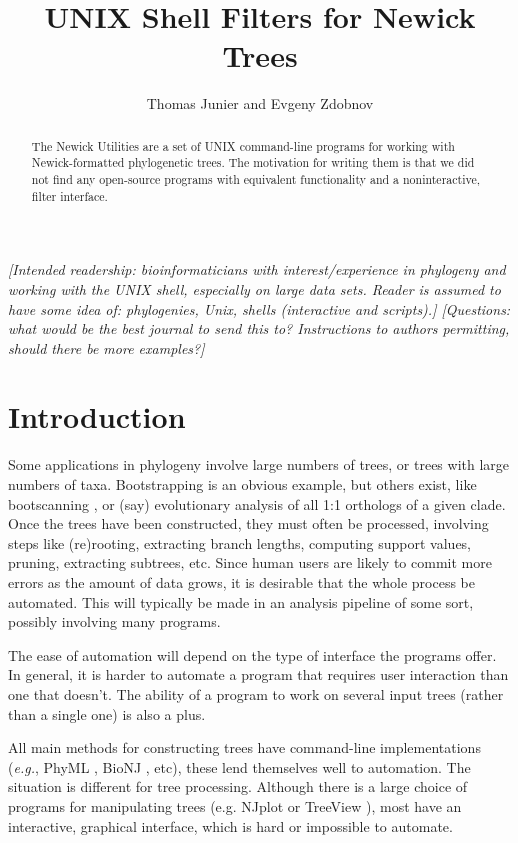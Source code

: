 \documentclass[a4paper,11pt]{article}
\title{UNIX Shell Filters for Newick Trees}
\author{Thomas Junier and Evgeny Zdobnov}
\begin{document}
\maketitle

\begin{abstract}
The Newick Utilities are a set of UNIX command-line programs for working with
Newick-formatted phylogenetic trees. The motivation for writing them is that we did not find any open-source programs with equivalent functionality and a noninteractive, filter interface.
\end{abstract}

\textit{\noindent{} [Intended readership: bioinformaticians with interest/experience in phylogeny and working with the UNIX shell, especially on large data sets. Reader is assumed to have some idea of: phylogenies, Unix, shells (interactive and scripts).]
[Questions: what would be the best journal to send this to? Instructions to authors permitting, should there be more examples?]}
 
\section*{Introduction}

Some applications in phylogeny involve large numbers of trees, or trees with large numbers of taxa. Bootstrapping is an obvious example, but others exist, like bootscanning \cite{Salminen1995}, or (say) evolutionary analysis of all 1:1 orthologs of a given clade. Once the trees have been constructed, they must often be processed, involving steps like (re)rooting, extracting branch lengths, computing support values, pruning, extracting subtrees, etc. Since human users are likely to commit more errors as the amount of  data grows, it is desirable that the whole process  be automated. This will typically be made in an analysis pipeline of some sort, possibly involving many programs.

The ease of automation will depend on the type of interface the programs offer. In general, it is harder to automate a program that requires user interaction than one that doesn't. The ability of a program to work on several input trees (rather than a single one) is also a plus.

All main methods for constructing trees have command-line implementations (\textit{e.g.}, PhyML \cite{Guindon2003}, BioNJ \cite{Gascuel1997}, etc), these lend themselves well to automation. 
The situation is different for tree processing. Although there is a large choice of programs for manipulating trees (e.g.
NJplot \cite{Perrière1996} or TreeView \cite{Page2002}), most have an interactive, graphical interface, which is hard or impossible to automate.
\end{document}
